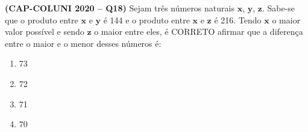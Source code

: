 \textbf{(CAP-COLUNI 2020 -- Q18)} Sejam três números naturais $\mathbf{x}$, $\mathbf{y}$, $\mathbf{z}$. Sabe-se que o produto entre $\mathbf{x}$ e $\mathbf{y}$ é 144 e o produto entre $\mathbf{x}$ e $\mathbf{z}$ é 216. Tendo $\mathbf{x}$ o maior valor possível e sendo $\mathbf{z}$ o maior entre eles, é CORRETO afirmar que a diferença entre o maior e o menor desses números é:

\begin{enumerate}
	\item 73
	\item 72
	\item 71
	\item 70
\end{enumerate}
